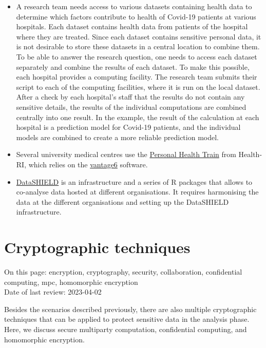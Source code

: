 \documentclass[
]{book}
\providecommand{\tightlist}{%
  \setlength{\itemsep}{0pt}\setlength{\parskip}{0pt}}
\begin{document}
\begin{itemize}
\tightlist
\item
  A research team needs access to various datasets containing health data to
  determine which factors contribute to health of Covid-19 patients at various
  hospitals. Each dataset contains health data from patients of the hospital where
  they are treated. Since each dataset contains sensitive personal data, it is not
  desirable to store these datasets in a central location to combine them. To be
  able to answer the research question, one needs to access each dataset separately
  and combine the results of each dataset. To make this possible, each hospital
  provides a computing facility. The research team submits their script to each of
  the computing facilities, where it is run on the local dataset. After a check by
  each hospital's staff that the results do not contain any sensitive details, the
  results of the individual computations are combined centrally into one result.
  In the example, the result of the calculation at each hospital is a prediction
  model for Covid-19 patients, and the individual models are combined to create a
  more reliable prediction model.
\item
  Several university medical centres use the
  \href{https://pht.health-ri.nl/}{Personal Health Train} from
  Health-RI, which relies on the \href{https://vantage6.ai/}{vantage6}
  software.
\item
  \href{https://www.datashield.org/index.php/about}{DataSHIELD} is
  an infrastructure and a series of R packages that allows to co-analyse data
  hosted at different organisations. It requires harmonising the data at the
  different organisations and setting up the DataSHIELD infrastructure.
\end{itemize}

\hypertarget{computational-cryptography}{%
\section{Cryptographic techniques}\label{computational-cryptography}}

On this page: encryption, cryptography, security, collaboration, confidential
computing, mpc, homomorphic encryption\\
Date of last review: 2023-04-02

Besides the scenarios described previously, there are also multiple cryptographic
techniques that can be applied to protect sensitive data in the analysis phase.
Here, we discuss secure multiparty computation, confidential computing, and
homomorphic encryption.
\end{document}
